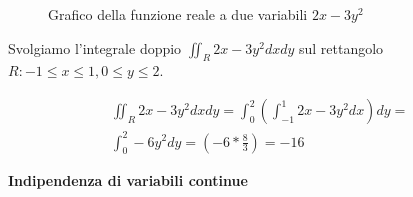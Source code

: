 \begin{exmp}
    \begin{figure}[htbp]
        \centering
        \caption{Grafico della funzione reale a due variabili $2x-3y^2$}
        \label{2varplot2}
    \end{figure}
    Svolgiamo l'integrale doppio $\iint_R 2x-3y^2 dx dy$ sul rettangolo $R: -1 \leq x \leq 1, 0 \leq y \leq 2$.

    \begin{equation*}
        \begin{aligned}
            \iint_R 2x-3y^2 dx dy = \int_0^2 \left( \int_{-1}^1 2x - 3y^2 dx \right) dy = \\
            \int_0^2 -6y^2 dy = (-6* \frac{8}{3}) = -16
        \end{aligned}
    \end{equation*}

\end{exmp}

\begin{defn}
    \textbf{Indipendenza di variabili continue}
\end{defn}

\begin{exrc}
\end{exrc}

